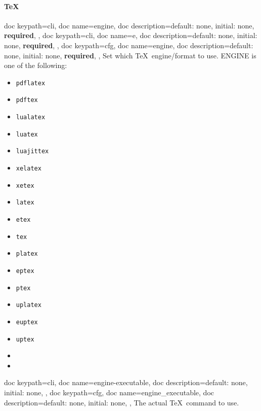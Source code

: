 \documentclass[a4paper, 11pt]{scrartcl}
\let\TeXold\TeX
\renewcommand\TeX{\TeXold\xspace}
\newcommand\metavar[1]{\textnormal{\textsf{#1}}}
\begin{document}
\paragraph{\TeX}
\begin{docKeys}[
		doc parameter={=\meta{engine}},
	]{
		{
			doc keypath=cli,
			doc name=engine,
			doc description={default: none, initial: none, \textcolor{CtpRed}{\bfseries\sffamily required}},
		},
		{
			doc keypath=cli,
			doc name=e,
			doc description={default: none, initial: none, \textcolor{CtpRed}{\bfseries\sffamily required}},
		},
		{
			doc keypath=cfg,
			doc name=engine,
			doc description={default: none, initial: none, \textcolor{CtpRed}{\bfseries\sffamily required}},
		},
	}
	Set which \TeX\ engine/format to use.
	\metavar{ENGINE} is one of the following:
	\begin{multicols}{3}
		\begin{itemize}
			\item \texttt{pdflatex}
			\item \texttt{pdftex}
			\item \texttt{lualatex}
			\item \texttt{luatex}
			\item \texttt{luajittex}
			\item \texttt{xelatex}
			\item \texttt{xetex}
			\item \texttt{latex}
			\item \texttt{etex}
			\item \texttt{tex}
			\item \texttt{platex}
			\item \texttt{eptex}
			\item \texttt{ptex}
			\item \texttt{uplatex}
			\item \texttt{euptex}
			\item \texttt{uptex}
			\item[]
			\item[]
		\end{itemize}
	\end{multicols}
\end{docKeys}
\begin{docKeys}[
		doc parameter={=\meta{engine\_executable}},
	]{
		{
			doc keypath=cli,
			doc name=engine-executable,
			doc description={default: none, initial: none},
		},
		{
			doc keypath=cfg,
			doc name=engine_executable,
			doc description={default: none, initial: none},
		},
	}
	The actual \TeX\ command to use.
\end{docKeys}
\end{document}
